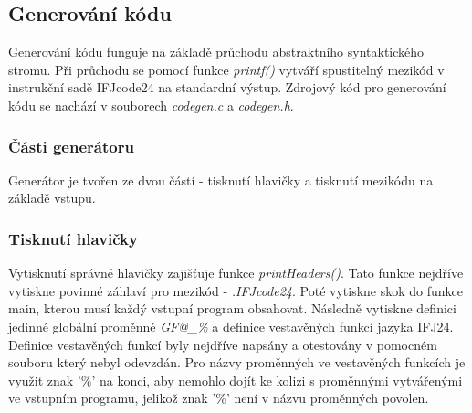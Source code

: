 \documentclass[a4paper, 12pt]{article}
\begin{document}
\newpage
\subsection{Generování kódu}
Generování kódu funguje na základě průchodu abstraktního syntaktického stromu. Při průchodu se pomocí funkce \textit{printf()} vytváří spustitelný mezikód v instrukční sadě IFJcode24 na standardní výstup. Zdrojový kód pro generování kódu se nachází v souborech \textit{codegen.c} a \textit{codegen.h}.
\subsubsection{Části generátoru}
Generátor je tvořen ze dvou částí - tisknutí hlavičky a tisknutí mezikódu na základě vstupu.

\subsubsection{Tisknutí hlavičky}
Vytisknutí správné hlavičky zajišťuje funkce \textit{printHeaders()}. Tato funkce nejdříve vytiskne povinné záhlaví pro mezikód - \textit{.IFJcode24}. Poté vytiskne skok do funkce main, kterou musí každý vstupní program obsahovat. Následně vytiskne definici jedinné globální proměnné \textit{GF@\_\%} a definice vestavěných funkcí jazyka IFJ24. Definice vestavěných funkcí byly nejdříve napsány a otestovány v pomocném souboru který nebyl odevzdán. Pro názvy proměnných ve vestavěných funkcích je využit znak '\%' na konci, aby nemohlo dojít ke kolizi s proměnnými vytvářenými ve vstupním programu, jelikož znak '\%' není v názvu proměnných povolen.
\end{document}
